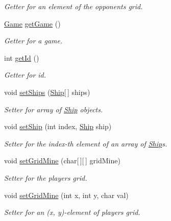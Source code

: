 \begin{DoxyCompactItemize}
\begin{DoxyCompactList}\small\item\em Getter for an element of the opponent\textquotesingle{}s grid. \end{DoxyCompactList}\item 
\hyperlink{classGame}{Game} \hyperlink{classPlayer_a08580623035eedb19e8b7a028ad64914}{get\+Game} ()
\begin{DoxyCompactList}\small\item\em Getter for a game. \end{DoxyCompactList}\item 
int \hyperlink{classPlayer_adea0e90dc94ac68c20d672f801dc951a}{get\+Id} ()
\begin{DoxyCompactList}\small\item\em Getter for id. \end{DoxyCompactList}\item 
void \hyperlink{classPlayer_ae4027662c9c93b5c023838a36a303a04}{set\+Ships} (\hyperlink{classShip}{Ship}\mbox{[}$\,$\mbox{]} ships)
\begin{DoxyCompactList}\small\item\em Setter for array of \hyperlink{classShip}{Ship} objects. \end{DoxyCompactList}\item 
void \hyperlink{classPlayer_a3235c3e8a2434947ebe9748abed80fda}{set\+Ship} (int index, \hyperlink{classShip}{Ship} ship)
\begin{DoxyCompactList}\small\item\em Setter for the index-\/th element of an array of \hyperlink{classShip}{Ship}\textquotesingle{}s. \end{DoxyCompactList}\item 
void \hyperlink{classPlayer_affa3bbe73b17f997591a92aaf6d8da33}{set\+Grid\+Mine} (char\mbox{[}$\,$\mbox{]}\mbox{[}$\,$\mbox{]} grid\+Mine)
\begin{DoxyCompactList}\small\item\em Setter for the player\textquotesingle{}s grid. \end{DoxyCompactList}\item 
void \hyperlink{classPlayer_a8f3ce6a037eabdb592f421b77948af27}{set\+Grid\+Mine} (int x, int y, char val)
\begin{DoxyCompactList}\small\item\em Setter for an (x, y)-\/element of player\textquotesingle{}s grid. \end{DoxyCompactList}\item 

\end{DoxyCompactItemize}
